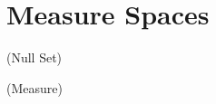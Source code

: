 \documentclass[12pt,twoside,draft]{book}
\begin{document}
\section{Measure Spaces}
\begin{definition}
  (Null Set)
\end{definition}
\begin{definition}
  (Measure)
\end{definition}




\printindex
\end{document}
